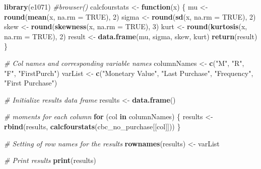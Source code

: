\documentclass[
]{article}
\newenvironment{Shaded}{\begin{snugshade}}{\end{snugshade}}
\newcommand{\AttributeTok}[1]{\textcolor[rgb]{0.13,0.29,0.53}{#1}}
\newcommand{\CommentTok}[1]{\textcolor[rgb]{0.56,0.35,0.01}{\textit{#1}}}
\newcommand{\ConstantTok}[1]{\textcolor[rgb]{0.56,0.35,0.01}{#1}}
\newcommand{\ControlFlowTok}[1]{\textcolor[rgb]{0.13,0.29,0.53}{\textbf{#1}}}
\newcommand{\DecValTok}[1]{\textcolor[rgb]{0.00,0.00,0.81}{#1}}
\newcommand{\FunctionTok}[1]{\textcolor[rgb]{0.13,0.29,0.53}{\textbf{#1}}}
\newcommand{\NormalTok}[1]{#1}
\newcommand{\OtherTok}[1]{\textcolor[rgb]{0.56,0.35,0.01}{#1}}
\newcommand{\StringTok}[1]{\textcolor[rgb]{0.31,0.60,0.02}{#1}}
\begin{document}
\begin{Shaded}
\begin{Highlighting}[]
\FunctionTok{library}\NormalTok{(e1071)}
\CommentTok{\#browser()}
\NormalTok{calcfourstats }\OtherTok{\textless{}{-}} \ControlFlowTok{function}\NormalTok{(x) \{}
\NormalTok{  mu }\OtherTok{\textless{}{-}} \FunctionTok{round}\NormalTok{(}\FunctionTok{mean}\NormalTok{(x, }\AttributeTok{na.rm =} \ConstantTok{TRUE}\NormalTok{), }\DecValTok{2}\NormalTok{)}
\NormalTok{  sigma }\OtherTok{\textless{}{-}} \FunctionTok{round}\NormalTok{(}\FunctionTok{sd}\NormalTok{(x, }\AttributeTok{na.rm =} \ConstantTok{TRUE}\NormalTok{), }\DecValTok{2}\NormalTok{)}
\NormalTok{  skew }\OtherTok{\textless{}{-}} \FunctionTok{round}\NormalTok{(}\FunctionTok{skewness}\NormalTok{(x, }\AttributeTok{na.rm =} \ConstantTok{TRUE}\NormalTok{), }\DecValTok{3}\NormalTok{)}
\NormalTok{  kurt }\OtherTok{\textless{}{-}} \FunctionTok{round}\NormalTok{(}\FunctionTok{kurtosis}\NormalTok{(x, }\AttributeTok{na.rm =} \ConstantTok{TRUE}\NormalTok{), }\DecValTok{2}\NormalTok{)}
\NormalTok{  result }\OtherTok{\textless{}{-}} \FunctionTok{data.frame}\NormalTok{(mu, sigma, skew, kurt)}
  \FunctionTok{return}\NormalTok{(result)}
\NormalTok{\}}

\CommentTok{\# Col names and corresponding variable names}
\NormalTok{columnNames }\OtherTok{\textless{}{-}} \FunctionTok{c}\NormalTok{(}\StringTok{"M"}\NormalTok{, }\StringTok{"R"}\NormalTok{, }\StringTok{"F"}\NormalTok{, }\StringTok{"FirstPurch"}\NormalTok{)}
\NormalTok{varList }\OtherTok{\textless{}{-}} \FunctionTok{c}\NormalTok{(}\StringTok{"Monetary Value"}\NormalTok{, }\StringTok{"Last Purchase"}\NormalTok{, }\StringTok{"Frequency"}\NormalTok{, }\StringTok{"First Purchase"}\NormalTok{)}

\CommentTok{\# Initialize results data frame}
\NormalTok{results }\OtherTok{\textless{}{-}} \FunctionTok{data.frame}\NormalTok{()}

\CommentTok{\# moments for each column}
\ControlFlowTok{for}\NormalTok{ (col }\ControlFlowTok{in}\NormalTok{ columnNames) \{}
\NormalTok{  results }\OtherTok{\textless{}{-}} \FunctionTok{rbind}\NormalTok{(results, }\FunctionTok{calcfourstats}\NormalTok{(cbc\_no\_purchase[[col]]))}
\NormalTok{\}}

\CommentTok{\# Setting of row names for the results}
\FunctionTok{rownames}\NormalTok{(results) }\OtherTok{\textless{}{-}}\NormalTok{ varList}

\CommentTok{\# Print results}
\FunctionTok{print}\NormalTok{(results)}
\end{Highlighting}
\end{Shaded}
\end{document}
